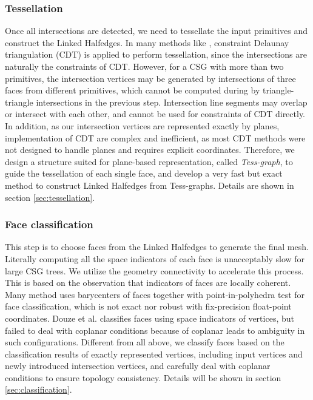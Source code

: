 \documentclass[10pt,journal,compsoc]{IEEEtran}
\begin{document}
\subsubsection{Tessellation}

Once all intersections are detected, we need to tessellate the input primitives and construct the Linked Halfedges. In many methods like \cite{ogayar2015deferred}, constraint Delaunay triangulation (CDT) is applied to perform tessellation, since the intersections are naturally the constraints of CDT. However, for a CSG with more than two primitives, the intersection vertices may be generated by intersections of three faces from different primitives, which cannot be computed during by triangle-triangle intersections in the previous step. Intersection line segments may overlap or intersect with each other, and cannot be used for constraints of CDT directly. In addition, as our intersection vertices are represented exactly by planes, implementation of CDT are complex and inefficient, as most CDT methods were not designed to handle planes and requires explicit coordinates. Therefore, we design a structure suited for plane-based representation, called \emph{Tess-graph}, to guide the tessellation of each single face, and develop a very fast but exact method to construct Linked Halfedges from Tess-graphs. Details are shown in section \ref{sec:tessellation}.

\subsubsection{Face classification}

This step is to choose faces from the Linked Halfedges to generate the final mesh. Literally computing all the space indicators of each face is unacceptably slow for large CSG trees. We utilize the geometry connectivity to accelerate this process. This is based on the observation that indicators of faces are locally coherent. Many method uses barycenters of faces together with point-in-polyhedra test for face classification, which is not exact nor robust with fix-precision float-point coordinates. Douze et al. \cite{douze2015quickcsg} classifies faces using space indicators of vertices, but failed to deal with coplanar conditions because of coplanar leads to ambiguity in such configurations. Different from all above, we classify faces based on the classification results of exactly represented vertices, including input vertices and newly introduced intersection vertices, and carefully deal with coplanar conditions to ensure topology consistency. Details will be shown in section \ref{sec:classification}.
\end{document}
